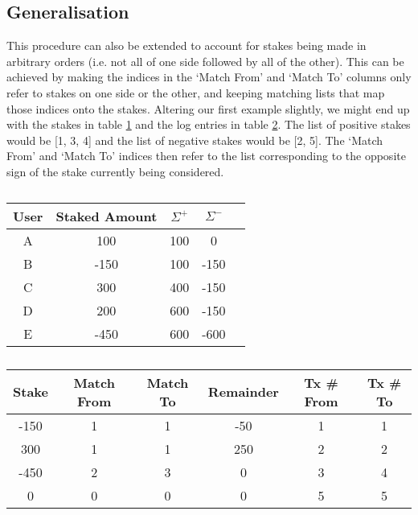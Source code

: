 \subsection{Generalisation}

This procedure can also be extended to account for stakes being made in arbitrary orders (i.e. not all of one side followed by all of the other). This can be achieved by making the indices in the `Match From' and `Match To' columns only refer to stakes on one side or the other, and keeping matching lists that map those indices onto the stakes. Altering our first example slightly, we might end up with the stakes in table \ref{appa:modifiedexample} and the log entries in table \ref{appa:modifiedexamplelog}. The list of positive stakes would be [1, 3, 4] and the list of negative stakes would be [2, 5]. The `Match From' and `Match To' indices then refer to the list corresponding to the opposite sign of the stake currently being considered.

\begin{table}[ht]
\centering
\caption{}
\label{appa:modifiedexample}
\begin{tabular}{|c|c|c|c|c|}
\hline
User  & Staked Amount & $\Sigma^+$ & $\Sigma^-$ \\ \hline
A & 100           & 100                      & 0                                                                       \\ \hline
B & -150           & 100                      & -150                                                                     \\ \hline
C & 300           & 400                      & -150                                                                       \\ \hline
D & 200          & 600                      & -150                                                                    \\ \hline
E & -450          & 600                      & -600                                                                    \\ \hline
\end{tabular}
\end{table}

\begin{table}[ht]
\centering
\caption{}
\label{appa:modifiedexamplelog}
\begin{tabular}{|c|c|c|c|c|c|}
\hline
Stake & Match From & Match To & Remainder & Tx \# From & Tx \# To\\ \hline
-150  & 1          & 1        & -50      & 1 & 1 \\ \hline
300   & 1          & 1        & 250      & 2 & 2 \\ \hline
-450  & 2          & 3        & 0       &  3 & 4 \\ \hline
0  & 0         & 0        & 0 & 5 & 5            \\ \hline
\end{tabular}

\end{table}

